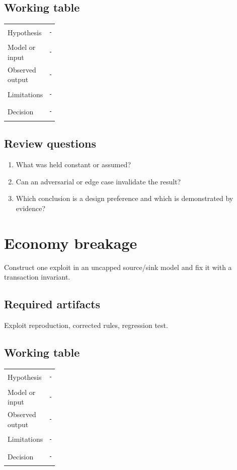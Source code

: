 \documentclass[11pt]{article}
\begin{document}
\subsection{Working table}
\begin{tabularx}{\linewidth}{@{}p{0.20\linewidth}X@{}}\toprule
Hypothesis & \rule{0.90\linewidth}{0.4pt}\\[0.35cm]
Model or input & \rule{0.90\linewidth}{0.4pt}\\[0.35cm]
Observed output & \rule{0.90\linewidth}{0.4pt}\\[0.35cm]
Limitations & \rule{0.90\linewidth}{0.4pt}\\[0.35cm]
Decision & \rule{0.90\linewidth}{0.4pt}\\\bottomrule\end{tabularx}

\subsection{Review questions}
\begin{enumerate}
\item What was held constant or assumed?
\item Can an adversarial or edge case invalidate the result?
\item Which conclusion is a design preference and which is demonstrated by evidence?
\end{enumerate}

\section{Economy breakage}
Construct one exploit in an uncapped source/sink model and fix it with a transaction invariant.


\subsection{Required artifacts}
Exploit reproduction, corrected rules, regression test.


\subsection{Working table}
\begin{tabularx}{\linewidth}{@{}p{0.20\linewidth}X@{}}\toprule
Hypothesis & \rule{0.90\linewidth}{0.4pt}\\[0.35cm]
Model or input & \rule{0.90\linewidth}{0.4pt}\\[0.35cm]
Observed output & \rule{0.90\linewidth}{0.4pt}\\[0.35cm]
Limitations & \rule{0.90\linewidth}{0.4pt}\\[0.35cm]
Decision & \rule{0.90\linewidth}{0.4pt}\\\bottomrule\end{tabularx}
\end{document}
